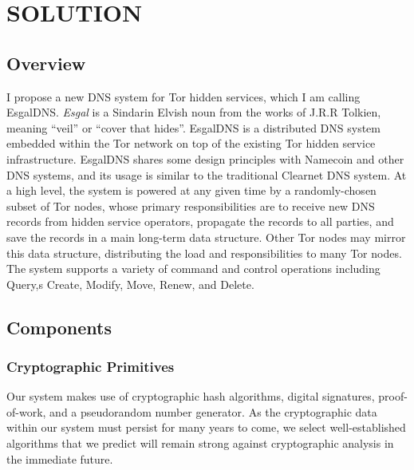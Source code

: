 \chapter{\uppercase{Solution}}

\section{Overview}

I propose a new DNS system for Tor hidden services, which I am calling EsgalDNS. \emph{Esgal} is a Sindarin Elvish noun from the works of J.R.R Tolkien, meaning ``veil'' or ``cover that hides''.\cite{SindarinDict} EsgalDNS is a distributed DNS system embedded within the Tor network on top of the existing Tor hidden service infrastructure. EsgalDNS shares some design principles with Namecoin and other DNS systems, and its usage is similar to the traditional Clearnet DNS system. At a high level, the system is powered at any given time by a randomly-chosen subset of Tor nodes, whose primary responsibilities are to receive new DNS records from hidden service operators, propagate the records to all parties, and save the records in a main long-term data structure. Other Tor nodes may mirror this data structure, distributing the load and responsibilities to many Tor nodes. The system supports a variety of command and control operations including Query,s Create, Modify, Move, Renew, and Delete. 

\section{Components}

\subsection{Cryptographic Primitives}

Our system makes use of cryptographic hash algorithms, digital signatures, proof-of-work, and a pseudorandom number generator. As the cryptographic data within our system must persist for many years to come, we select well-established algorithms that we predict will remain strong against cryptographic analysis in the immediate future.

